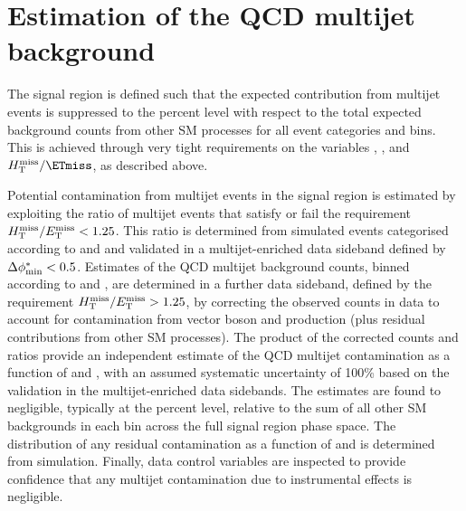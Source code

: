\section{Estimation of the QCD multijet background}
\label{sec:qcd_background}

The signal region is defined such that the expected contribution from
multijet events is suppressed to the percent level with respect to the
total expected background counts from other SM processes for all event
categories and \scalht bins. This is achieved through very tight
requirements on the variables \alphat, \dphi, and $\mht / \ETmiss$, as
described above. 

Potential contamination from multijet events in the signal region is
estimated by exploiting the ratio of multijet events that satisfy or
fail the requirement $H_{\mathrm{T}}^{\text{miss}} / E_{\mathrm{T}}^{\text{miss}} < 1.25$. This ratio is determined from
simulated events categorised according to \njet and \scalht and
validated in a multijet-enriched data sideband defined by $\Delta\phi^{*}_{\rm min} <
0.5$. Estimates of the QCD multijet background counts, binned
according to \njet and \scalht, are determined in a further data
sideband, defined by the requirement $H_{\mathrm{T}}^{\text{miss}} / E_{\mathrm{T}}^{\text{miss}} > 1.25$, by correcting
the observed counts in data to account for contamination from vector
boson and \ttbar production (plus residual contributions from other SM
processes). The product of the corrected counts and ratios provide an
independent estimate of the QCD multijet contamination as a function
of \njet and \scalht, with an assumed systematic uncertainty of 100\%
based on the validation in the multijet-enriched data sidebands. The
estimates are found to negligible, typically at the percent level,
relative to the sum of all other SM backgrounds in each bin across the
full signal region phase space. The distribution of any residual
contamination as a function of \nb and \mht is determined from
simulation. Finally, data control variables are inspected to provide
confidence that any multijet contamination due to instrumental effects
is negligible.

